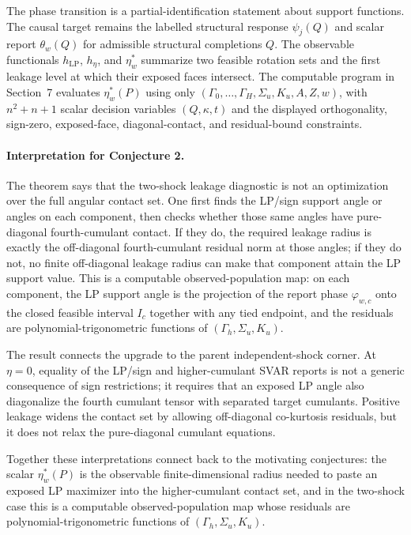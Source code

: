 \documentclass[11pt]{article}
\theoremstyle{definition}
\theoremstyle{plain}
\theoremstyle{remark}
\begin{document}
The phase transition is a partial-identification statement about support functions.  The causal target remains the labelled structural response \(\psi_j(Q)\) and scalar report \(\theta_w(Q)\) for admissible structural completions \(Q\).  The observable functionals \(h_{\mathrm{LP}}\), \(h_\eta\), and \(\eta_w^*\) summarize two feasible rotation sets and the first leakage level at which their exposed faces intersect.  The computable program in Section~7 evaluates \(\eta_w^*(P)\) using only \((\Gamma_0,\ldots,\Gamma_H,\Sigma_u,K_u,A,Z,w)\), with \(n^2+n+1\) scalar decision variables \((Q,\kappa,t)\) and the displayed orthogonality, sign-zero, exposed-face, diagonal-contact, and residual-bound constraints.

\paragraph{Interpretation for Conjecture 2.}
The theorem says that the two-shock leakage diagnostic is not an optimization over the full angular contact set.  One first finds the LP/sign support angle or angles on each component, then checks whether those same angles have pure-diagonal fourth-cumulant contact.  If they do, the required leakage radius is exactly the off-diagonal fourth-cumulant residual norm at those angles; if they do not, no finite off-diagonal leakage radius can make that component attain the LP support value.  This is a computable observed-population map: on each component, the LP support angle is the projection of the report phase \(\varphi_{w,c}\) onto the closed feasible interval \(I_c\) together with any tied endpoint, and the residuals are polynomial-trigonometric functions of \((\Gamma_h,\Sigma_u,K_u)\).

The result connects the upgrade to the parent independent-shock corner.  At \(\eta=0\), equality of the LP/sign and higher-cumulant SVAR reports is not a generic consequence of sign restrictions; it requires that an exposed LP angle also diagonalize the fourth cumulant tensor with separated target cumulants.  Positive leakage widens the contact set by allowing off-diagonal co-kurtosis residuals, but it does not relax the pure-diagonal cumulant equations.

Together these interpretations connect back to the motivating conjectures: the scalar \(\eta_w^*(P)\) is the observable finite-dimensional radius needed to paste an exposed LP maximizer into the higher-cumulant contact set, and in the two-shock case this is a computable observed-population map whose residuals are polynomial-trigonometric functions of \((\Gamma_h,\Sigma_u,K_u)\).
\end{document}
